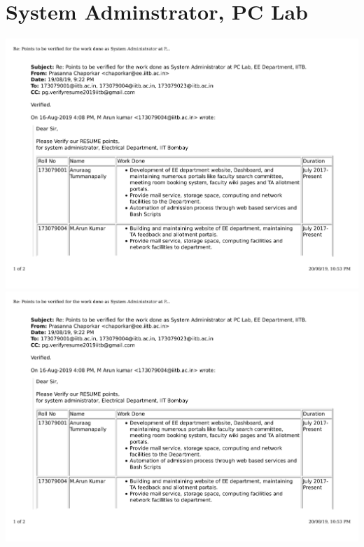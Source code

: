 \documentclass{article}
\begin{document}
\section{ System Adminstrator, PC Lab}
	\includegraphics[page=1, scale=0.5]{proofs/sysad_work.pdf}\\
	\includegraphics[page=2, scale=0.5]{proofs/sysad_work.pdf}\\
\end{document}
